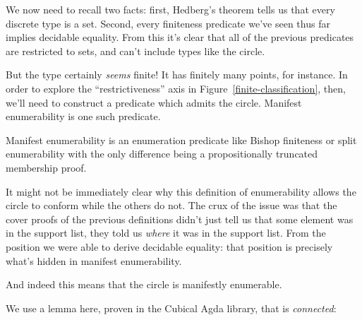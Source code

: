 We now need to recall two facts: first, Hedberg's theorem tells us that every
discrete type is a set.
Second, every finiteness predicate we've seen thus far implies decidable
equality.
From this it's clear that all of the previous predicates are restricted to sets,
and can't include types like the circle.

But the type certainly \emph{seems} finite!
It has finitely many points, for instance.
In order to explore the ``restrictiveness'' axis in
Figure~\ref{finite-classification}, then, we'll need to construct a predicate
which admits the circle.
Manifest enumerability is one such predicate.
\begin{definition}
  Manifest enumerability is an enumeration predicate like Bishop finiteness or
  split enumerability with the only difference being a propositionally truncated
  membership proof.
  \begin{agdalisting}
  \end{agdalisting}
\end{definition}

It might not be immediately clear why this definition of enumerability allows
the circle to conform while the others do not.
The crux of the issue was that the cover proofs of the previous definitions
didn't just tell us that some element was in the support list, they told us
\emph{where} it was in the support list.
From the position we were able to derive decidable equality: that position is
precisely what's hidden in manifest enumerability.

And indeed this means that the circle is manifestly enumerable.
\begin{agdalisting}
\end{agdalisting}
We use a lemma here, proven in the Cubical Agda library, that
 is \emph{connected}:
\begin{agdalisting}
\end{agdalisting}
